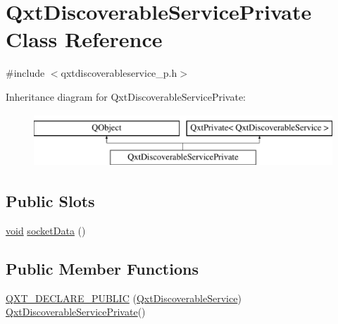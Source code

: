 \hypertarget{class_qxt_discoverable_service_private}{\section{Qxt\-Discoverable\-Service\-Private Class Reference}
\label{class_qxt_discoverable_service_private}
}


{\ttfamily \#include $<$qxtdiscoverableservice\-\_\-p.\-h$>$}

Inheritance diagram for Qxt\-Discoverable\-Service\-Private\-:\begin{figure}[H]
\begin{center}
\leavevmode
\includegraphics[height=2.000000cm]{class_qxt_discoverable_service_private}
\end{center}
\end{figure}
\subsection*{Public Slots}
\begin{DoxyCompactItemize}
\item 
\hyperlink{group___u_a_v_objects_plugin_ga444cf2ff3f0ecbe028adce838d373f5c}{void} \hyperlink{class_qxt_discoverable_service_private_af1d5580878101443035c02febff3e72f}{socket\-Data} ()
\end{DoxyCompactItemize}
\subsection*{Public Member Functions}
\begin{DoxyCompactItemize}
\item 
\hyperlink{class_qxt_discoverable_service_private_aa8e8a61c4d7acf4e67923bb27c1702ee}{Q\-X\-T\-\_\-\-D\-E\-C\-L\-A\-R\-E\-\_\-\-P\-U\-B\-L\-I\-C} (\hyperlink{class_qxt_discoverable_service}{Qxt\-Discoverable\-Service}) \hyperlink{class_qxt_discoverable_service_private}{Qxt\-Discoverable\-Service\-Private}()
\end{DoxyCompactItemize}
